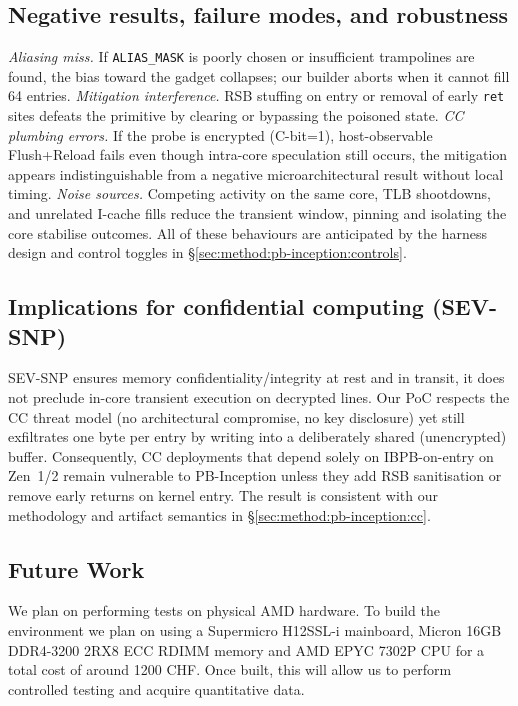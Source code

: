 \documentclass[11pt,a4paper]{article}
\begin{document}
\vspace{-0.5em}

\subsection{Negative results, failure modes, and robustness}
\emph{Aliasing miss.} If \texttt{ALIAS\_MASK} is poorly chosen or insufficient trampolines are found, the bias toward the gadget collapses; our builder aborts when it cannot fill 64 entries.  
\emph{Mitigation interference.} RSB stuffing on entry or removal of early \texttt{ret} sites defeats the primitive by clearing or bypassing the poisoned state.  
\emph{CC plumbing errors.} If the probe is encrypted (C-bit=1), host-observable Flush+Reload fails even though intra-core speculation still occurs, the mitigation appears indistinguishable from a negative microarchitectural result without local timing.  
\emph{Noise sources.} Competing activity on the same core, TLB shootdowns, and unrelated I-cache fills reduce the transient window, pinning and isolating the core stabilise outcomes. All of these behaviours are anticipated by the harness design and control toggles in \S\ref{sec:method:pb-inception:controls}.\cite{linux_srso_doc,linux_rsb_doc,wikner2025breaking}

\subsection{Implications for confidential computing (SEV-SNP)}
SEV-SNP ensures memory confidentiality/integrity at rest and in transit, it does not preclude in-core transient execution on decrypted lines. Our PoC respects the CC threat model (no architectural compromise, no key disclosure) yet still exfiltrates one byte per entry by writing into a deliberately shared (unencrypted) buffer. Consequently, CC deployments that depend solely on IBPB-on-entry on Zen~1/2 remain vulnerable to PB-Inception unless they add RSB sanitisation or remove early returns on kernel entry. The result is consistent with our methodology and artifact semantics in \S\ref{sec:method:pb-inception:cc}.\cite{wikner2025breaking,linux_srso_doc}

\subsection{Future Work}
We plan on performing tests on physical AMD hardware. To build the environment we plan on using a Supermicro H12SSL-i mainboard, Micron 16GB DDR4-3200 2RX8 ECC RDIMM memory and AMD EPYC 7302P CPU for a total cost of around 1200 CHF. Once built, this will allow us to perform controlled testing and acquire quantitative data.
\end{document}

